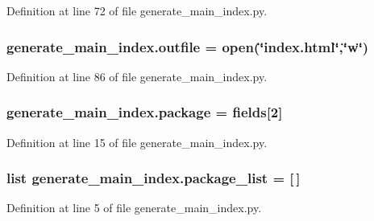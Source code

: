 Definition at line 72 of file generate\+\_\+main\+\_\+index.\+py.

\subsubsection[{\texorpdfstring{outfile}{outfile}}]{\setlength{\rightskip}{0pt plus 5cm}generate\+\_\+main\+\_\+index.\+outfile = open(\char`\"{}index.\+html\char`\"{},\char`\"{}w\char`\"{})}\hypertarget{namespacegenerate__main__index_a19a514ee39deee84f7fd96349f2f0ee3}{}\label{namespacegenerate__main__index_a19a514ee39deee84f7fd96349f2f0ee3}


Definition at line 86 of file generate\+\_\+main\+\_\+index.\+py.

\subsubsection[{\texorpdfstring{package}{package}}]{\setlength{\rightskip}{0pt plus 5cm}generate\+\_\+main\+\_\+index.\+package = {\bf fields}\mbox{[}2\mbox{]}}\hypertarget{namespacegenerate__main__index_a9d2771b2e20dd95da1e60bc44477f548}{}\label{namespacegenerate__main__index_a9d2771b2e20dd95da1e60bc44477f548}


Definition at line 15 of file generate\+\_\+main\+\_\+index.\+py.

\subsubsection[{\texorpdfstring{package\+\_\+list}{package_list}}]{\setlength{\rightskip}{0pt plus 5cm}list generate\+\_\+main\+\_\+index.\+package\+\_\+list = \mbox{[}$\,$\mbox{]}}\hypertarget{namespacegenerate__main__index_a0ad453a98c17595c6a84bec788df10e1}{}\label{namespacegenerate__main__index_a0ad453a98c17595c6a84bec788df10e1}


Definition at line 5 of file generate\+\_\+main\+\_\+index.\+py.

